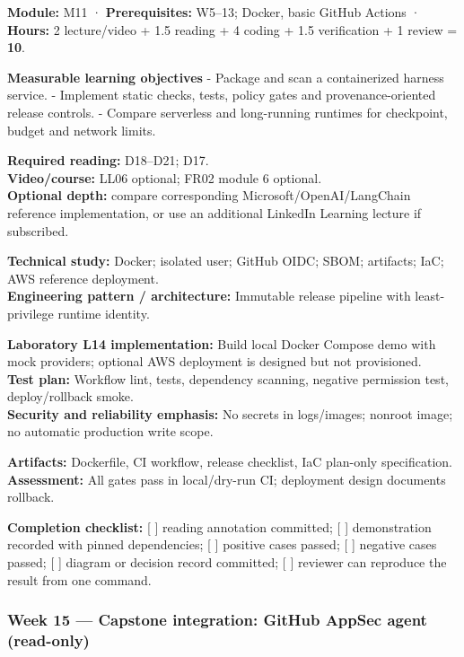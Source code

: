 \documentclass[
  10pt,
]{article}
\begin{document}
\textbf{Module:} M11 · \textbf{Prerequisites:} W5--13; Docker, basic
GitHub Actions · \textbf{Hours:} 2 lecture/video + 1.5 reading + 4
coding + 1.5 verification + 1 review = \textbf{10}.

\textbf{Measurable learning objectives} - Package and scan a
containerized harness service. - Implement static checks, tests, policy
gates and provenance-oriented release controls. - Compare serverless and
long-running runtimes for checkpoint, budget and network limits.

\textbf{Required reading:} D18--D21; D17.\\
\textbf{Video/course:} LL06 optional; FR02 module 6 optional.\\
\textbf{Optional depth:} compare corresponding
Microsoft/OpenAI/LangChain reference implementation, or use an
additional LinkedIn Learning lecture if subscribed.

\textbf{Technical study:} Docker; isolated user; GitHub OIDC; SBOM;
artifacts; IaC; AWS reference deployment.\\
\textbf{Engineering pattern / architecture:} Immutable release pipeline
with least-privilege runtime identity.

\textbf{Laboratory L14 implementation:} Build local Docker Compose demo
with mock providers; optional AWS deployment is designed but not
provisioned.\\
\textbf{Test plan:} Workflow lint, tests, dependency scanning, negative
permission test, deploy/rollback smoke.\\
\textbf{Security and reliability emphasis:} No secrets in logs/images;
nonroot image; no automatic production write scope.

\textbf{Artifacts:} Dockerfile, CI workflow, release checklist, IaC
plan-only specification.\\
\textbf{Assessment:} All gates pass in local/dry-run CI; deployment
design documents rollback.

\textbf{Completion checklist:} {[} {]} reading annotation committed; {[}
{]} demonstration recorded with pinned dependencies; {[} {]} positive
cases passed; {[} {]} negative cases passed; {[} {]} diagram or decision
record committed; {[} {]} reviewer can reproduce the result from one
command.

\subsubsection{Week 15 --- Capstone integration: GitHub AppSec agent
(read-only)}\label{week-15-capstone-integration-github-appsec-agent-read-only}
\end{document}

